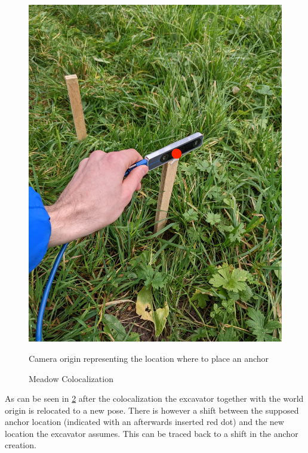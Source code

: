 \begin{figure}[ht]
    \centering
    \includegraphics[scale = 0.1]{images/colocalization/meadow_start.jpg}
    \label{fig:meadow_start}
    \caption{Camera origin representing the location where to place an anchor}
\end{figure}
\clearpage

\begin{figure}[htp]
    \centering
        \hfill
        \hfill
    \caption{Meadow Colocalization}
    \label{fig:meadow_basic}
\end{figure}

As can be seen in \cref{fig:meadow_basic} after the colocalization the excavator together with the world origin is relocated to a new pose. There is however a shift between the supposed anchor location (indicated with an afterwards inserted red dot) and the new location the excavator assumes. This can be traced back to a shift in the anchor creation. 

